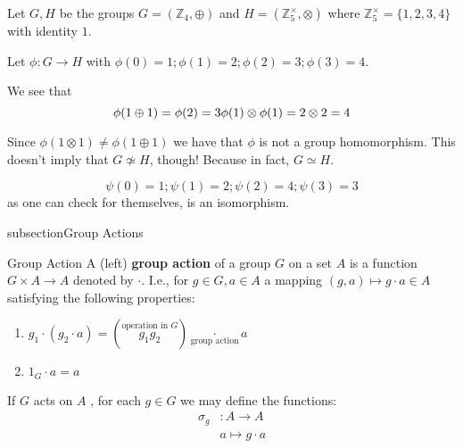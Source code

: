 \documentclass{article}
\begin{document}
\begin{cex}{}{}
    Let $G, H$ be the groups $G = \left( \mathbb{Z}_4, \oplus \right)$ and $H = \left( \mathbb{Z}_5^\times, \otimes \right)$ where $\mathbb{Z}_5^\times = \{1,2,3,4\}$ with identity $1$. 

    Let $ \phi : G \to H$ with $\phi(0) = 1; \phi(1) = 2; \phi(2) = 3; \phi(3) = 4$. 

    We see that
    \begin{equation*}
        \phi(1 \oplus 1)  = \phi(2) = 3\\
        \phi(1) \otimes \phi(1) = 2 \otimes 2 = 4\\
    \end{equation*}

    Since $\phi(1 \otimes 1) \neq \phi(1 \oplus 1)$ we have that $\phi$ is not a group homomorphism. This doesn't imply that $G \not\simeq H$, though! Because in fact, $G \simeq H$. 

    \[
        \psi(0) = 1; \psi(1) = 2; \psi(2) = 4; \psi(3) = 3
    \]
    as one can check for themselves, is an isomorphism.
\end{cex}


subsection{Group Actions}

\begin{cdef}{Group Action}{}
    A (left) \textbf{group action} of a group $G$ on a set $A$ is a function $G \times A \to A$ denoted by $\cdot$. I.e., for $g \in G, a \in A$ a mapping $(g,a) \mapsto g\cdot a \in A$ satisfying the following properties:
    \begin{enumerate}
        \item $g_1 \cdot (g_2 \cdot a) = \left( \overset{\text{operation in } G}{g_1g_2} \right) \underset{\text{group action}}{\cdot} a$
        \item $1_G \cdot a = a$
    \end{enumerate}

    If $G$ acts on $A$ , for each $g \in G$ we may define the functions:
    \begin{align*}
        \sigma_g &: A \to A\\
        & a \mapsto g\cdot a
    \end{align*}
\end{cdef}
\end{document}
